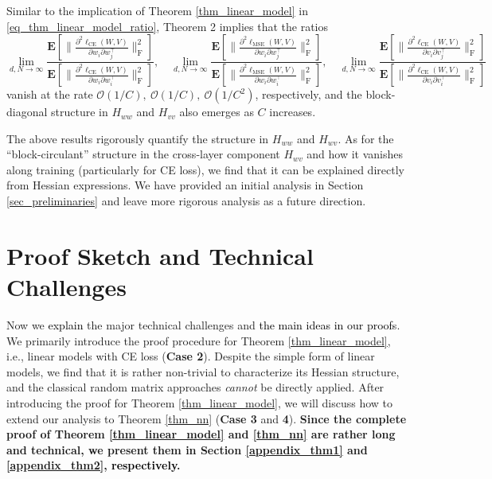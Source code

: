 \documentclass{article}
\newcommand{\E}{\mathbf{E}}
\newcommand{\rw}{\rightarrow}
\newcommand{\1}{^{(1)}}
\newcommand{\2}{^{(2)}}
\renewcommand{\l}{\left}
\renewcommand{\r}{\right}
\newcommand{\zhaoruirevise}[1]{\textcolor{black}{ #1}}
\begin{document}
Similar to the implication of Theorem \ref{thm_linear_model} in \eqref{eq_thm_linear_model_ratio}, Theorem 2 implies that the ratios
{\small \begin{equation}
\label{eq_thm_nn_ratio}
    \lim_{d,N\rw\infty} \frac{\E\l[\bigg\|\frac{\partial^2\ell_{\text{CE}}(W,V)}{\partial w_i  \partial w_j^\top}\bigg\|_{\operatorname{F}}^2\r]} {\E\l[\bigg\|\frac{\partial^2\ell_{\text{CE}}(W,V)}{\partial w_i  \partial w_i^\top}\bigg\|_{\operatorname{F}}^2\r]},\quad \lim_{d,N\rw\infty} \frac{\E\l[\bigg\|\frac{\partial^2\ell_{\text{MSE}}(W,V)}{\partial w_i  \partial w_j^\top}\bigg\|_{\operatorname{F}}^2\r]} {\E\l[\bigg\|\frac{\partial^2\ell_{\text{MSE}}(W,V)}{\partial w_i  \partial w_i^\top}\bigg\|_{\operatorname{F}}^2\r]},\quad \lim_{d,N\rw\infty} \frac{\E\l[\bigg\|\frac{\partial^2\ell_{\text{CE}}(W,V)}{\partial v_i  \partial v_j^\top}\bigg\|_{\operatorname{F}}^2\r]} {\E\l[\bigg\|\frac{\partial^2\ell_{\text{CE}}(W,V)}{\partial v_i  \partial v_i^\top}\bigg\|_{\operatorname{F}}^2\r]}
\end{equation}}
vanish at the rate $\mathcal{O}(1/C),\ \mathcal{O}(1/C),\ \mathcal{O}(1/C^2)$, respectively, and the block-diagonal structure in $H_{ww}$ and $H_{vv}$ also emerges as $C$ increases.

The above results rigorously quantify the structure in $H_{ww}$ and $H_{wv}$. As for the ``block-circulant'' structure in the cross-layer component $H_{wv}$  and how it vanishes along training (particularly for CE loss),  we find
that it can be explained directly from Hessian expressions. We have provided an initial analysis in Section \ref{sec_preliminaries} and leave more rigorous analysis as a future direction.

 




\section{Proof Sketch and Technical Challenges}

Now we \zhaoruirevise{explain} the major technical challenges and \zhaoruirevise{the main ideas in our proofs}. We primarily introduce the proof procedure for Theorem \ref{thm_linear_model}, i.e., linear models with CE loss ({\bf Case 2}).  Despite the simple form of linear models,  we find that it is rather non-trivial to characterize its Hessian structure, and the classical random matrix approaches {\it cannot} be directly applied. After introducing the proof for Theorem \ref{thm_linear_model},  we will discuss how to extend our analysis to Theorem \ref{thm_nn}  ({\bf Case 3} and {\bf 4}).
{\bf Since the complete proof of Theorem \ref{thm_linear_model} and \ref{thm_nn} are  rather  long and technical, we  present them in Section \ref{appendix_thm1} and \ref{appendix_thm2}, \zhaoruirevise{respectively}.} 
\end{document}
